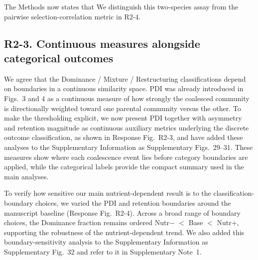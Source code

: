 The Methods now states that  We distinguish this two-species assay from the pairwise selection-correlation metric in R2-4.

\subsection*{R2-3. Continuous measures alongside categorical outcomes}

\responselabel
We agree that the Dominance / Mixture / Restructuring classifications depend on boundaries in a continuous similarity space. PDI was already introduced in Figs.~3 and 4 as a continuous measure of how strongly the coalesced community is directionally weighted toward one parental community versus the other. To make the thresholding explicit, we now present PDI together with asymmetry and retention magnitude as continuous auxiliary metrics underlying the discrete outcome classification, as shown in Response Fig.~R2-3, and have added these analyses to the Supplementary Information as Supplementary Figs.~29--31. These measures show where each coalescence event lies before category boundaries are applied, while the categorical labels provide the compact summary used in the main analyses.

To verify how sensitive our main nutrient-dependent result is to the classification-boundary choices, we varied the PDI and retention boundaries around the manuscript baseline (Response Fig.~R2-4). Across a broad range of boundary choices, the Dominance fraction remains ordered Nutr$-$ $<$ Base $<$ Nutr$+$, supporting the robustness of the nutrient-dependent trend. We also added this boundary-sensitivity analysis to the Supplementary Information as Supplementary Fig.~32 and refer to it in Supplementary Note~1.

